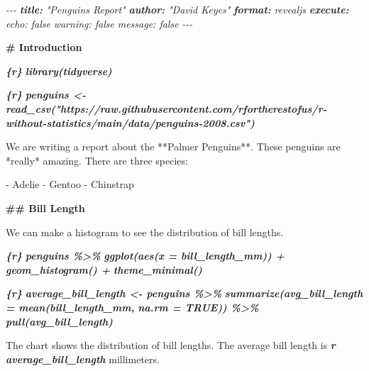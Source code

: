 \documentclass[
]{book}
\newenvironment{Shaded}{\begin{snugshade}}{\end{snugshade}}
\newcommand{\AnnotationTok}[1]{\textcolor[rgb]{0.56,0.35,0.01}{\textbf{\textit{#1}}}}
\newcommand{\CommentTok}[1]{\textcolor[rgb]{0.56,0.35,0.01}{\textit{#1}}}
\newcommand{\FunctionTok}[1]{\textcolor[rgb]{0.13,0.29,0.53}{\textbf{#1}}}
\newcommand{\InformationTok}[1]{\textcolor[rgb]{0.56,0.35,0.01}{\textbf{\textit{#1}}}}
\newcommand{\NormalTok}[1]{#1}
\newcommand{\SpecialStringTok}[1]{\textcolor[rgb]{0.31,0.60,0.02}{#1}}
\begin{document}
\begin{Shaded}
\begin{Highlighting}[]
\CommentTok{{-}{-}{-}}
\AnnotationTok{title:}\CommentTok{ "Penguins Report"}
\AnnotationTok{author:}\CommentTok{ "David Keyes"}
\AnnotationTok{format:}\CommentTok{ revealjs}
\AnnotationTok{execute:}\CommentTok{ }
\CommentTok{  echo: false}
\CommentTok{  warning: false}
\CommentTok{  message: false}
\CommentTok{{-}{-}{-}}

\FunctionTok{\# Introduction}

\InformationTok{\textasciigrave{}\textasciigrave{}\textasciigrave{}\{r\}}
\InformationTok{library(tidyverse)}
\InformationTok{\textasciigrave{}\textasciigrave{}\textasciigrave{}}

\InformationTok{\textasciigrave{}\textasciigrave{}\textasciigrave{}\{r\}}
\InformationTok{penguins \textless{}{-} read\_csv("https://raw.githubusercontent.com/rfortherestofus/r{-}without{-}statistics/main/data/penguins{-}2008.csv")}
\InformationTok{\textasciigrave{}\textasciigrave{}\textasciigrave{}}

\NormalTok{We are writing a report about the **Palmer Penguins**. These penguins are *really* amazing. There are three species:}

\SpecialStringTok{{-} }\NormalTok{Adelie}
\SpecialStringTok{{-} }\NormalTok{Gentoo}
\SpecialStringTok{{-} }\NormalTok{Chinstrap}

\FunctionTok{\#\# Bill Length}

\NormalTok{We can make a histogram to see the distribution of bill lengths.}

\InformationTok{\textasciigrave{}\textasciigrave{}\textasciigrave{}\{r\}}
\InformationTok{penguins \%\textgreater{}\% }
\InformationTok{  ggplot(aes(x = bill\_length\_mm)) +}
\InformationTok{  geom\_histogram() +}
\InformationTok{  theme\_minimal()}
\InformationTok{\textasciigrave{}\textasciigrave{}\textasciigrave{}}

\InformationTok{\textasciigrave{}\textasciigrave{}\textasciigrave{}\{r\}}
\InformationTok{average\_bill\_length \textless{}{-} penguins \%\textgreater{}\% }
\InformationTok{  summarize(avg\_bill\_length = mean(bill\_length\_mm,}
\InformationTok{                                   na.rm = TRUE)) \%\textgreater{}\% }
\InformationTok{  pull(avg\_bill\_length)}
\InformationTok{\textasciigrave{}\textasciigrave{}\textasciigrave{}}

\NormalTok{The chart shows the distribution of bill lengths. The average bill length is }\InformationTok{\textasciigrave{}r average\_bill\_length\textasciigrave{}}\NormalTok{ millimeters.}
\end{Highlighting}
\end{Shaded}
\end{document}
